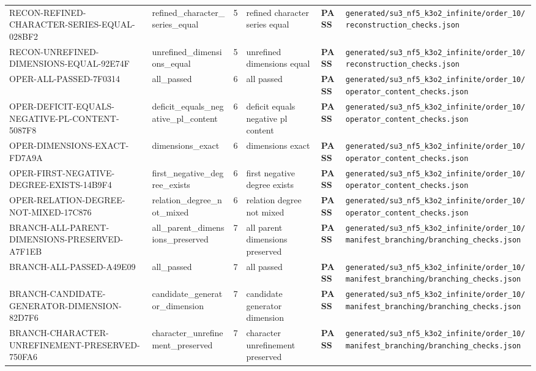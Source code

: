 \documentclass[11pt]{article}
\newcommand{\Pass}{\textcolor{green!50!black}{\textbf{PASS}}}
\newcommand{\RawPath}[1]{\texttt{#1}}
\begin{document}
\begin{longtable}{p{3cm}p{2.5cm}r p{3cm}l p{2cm}}
RECON-REFINED-CHARACTER-SERIES-EQUAL-028BF2 & refined\_character\_series\_equal & 5 & refined character series equal & \Pass & \RawPath{generated/su3\_nf5\_k3o2\_infinite/order\_10/reconstruction\_checks.json}\\
RECON-UNREFINED-DIMENSIONS-EQUAL-92E74F & unrefined\_dimensions\_equal & 5 & unrefined dimensions equal & \Pass & \RawPath{generated/su3\_nf5\_k3o2\_infinite/order\_10/reconstruction\_checks.json}\\
OPER-ALL-PASSED-7F0314 & all\_passed & 6 & all passed & \Pass & \RawPath{generated/su3\_nf5\_k3o2\_infinite/order\_10/operator\_content\_checks.json}\\
OPER-DEFICIT-EQUALS-NEGATIVE-PL-CONTENT-5087F8 & deficit\_equals\_negative\_pl\_content & 6 & deficit equals negative pl content & \Pass & \RawPath{generated/su3\_nf5\_k3o2\_infinite/order\_10/operator\_content\_checks.json}\\
OPER-DIMENSIONS-EXACT-FD7A9A & dimensions\_exact & 6 & dimensions exact & \Pass & \RawPath{generated/su3\_nf5\_k3o2\_infinite/order\_10/operator\_content\_checks.json}\\
OPER-FIRST-NEGATIVE-DEGREE-EXISTS-14B9F4 & first\_negative\_degree\_exists & 6 & first negative degree exists & \Pass & \RawPath{generated/su3\_nf5\_k3o2\_infinite/order\_10/operator\_content\_checks.json}\\
OPER-RELATION-DEGREE-NOT-MIXED-17C876 & relation\_degree\_not\_mixed & 6 & relation degree not mixed & \Pass & \RawPath{generated/su3\_nf5\_k3o2\_infinite/order\_10/operator\_content\_checks.json}\\
BRANCH-ALL-PARENT-DIMENSIONS-PRESERVED-A7F1EB & all\_parent\_dimensions\_preserved & 7 & all parent dimensions preserved & \Pass & \RawPath{generated/su3\_nf5\_k3o2\_infinite/order\_10/manifest\_branching/branching\_checks.json}\\
BRANCH-ALL-PASSED-A49E09 & all\_passed & 7 & all passed & \Pass & \RawPath{generated/su3\_nf5\_k3o2\_infinite/order\_10/manifest\_branching/branching\_checks.json}\\
BRANCH-CANDIDATE-GENERATOR-DIMENSION-82D7F6 & candidate\_generator\_dimension & 7 & candidate generator dimension & \Pass & \RawPath{generated/su3\_nf5\_k3o2\_infinite/order\_10/manifest\_branching/branching\_checks.json}\\
BRANCH-CHARACTER-UNREFINEMENT-PRESERVED-750FA6 & character\_unrefinement\_preserved & 7 & character unrefinement preserved & \Pass & \RawPath{generated/su3\_nf5\_k3o2\_infinite/order\_10/manifest\_branching/branching\_checks.json}\\

\end{longtable}
\end{document}

